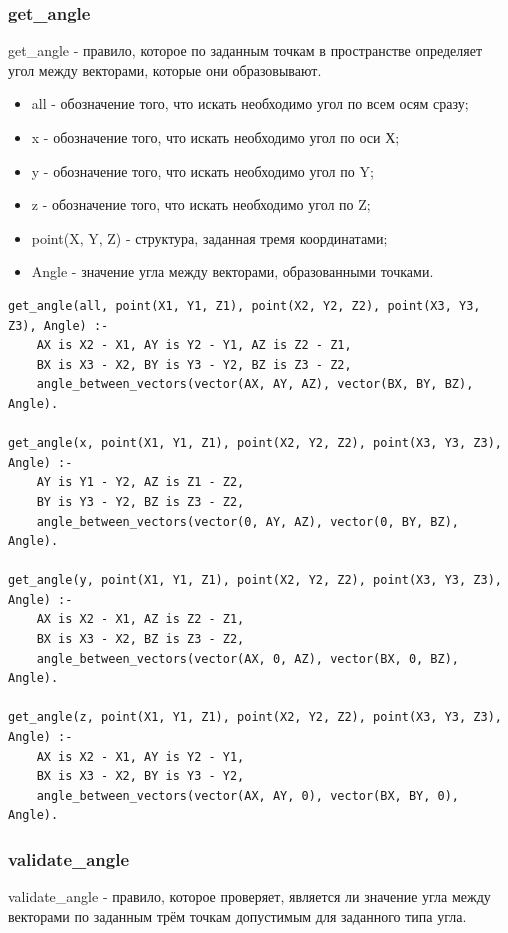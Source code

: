 \subsubsection{get\_angle}
\hspace{0.6cm} get\_angle - правило, которое по заданным точкам в пространстве определяет угол между векторами, которые они образовывают.

\begin{itemize}
	\item all - обозначение того, что искать необходимо угол по всем осям сразу;
	\item x - обозначение того, что искать необходимо угол по оси Х;
	\item y - обозначение того, что искать необходимо угол по Y;
	\item z - обозначение того, что искать необходимо угол по Z;
	\item point(X, Y, Z) - структура, заданная тремя координатами;
	\item Angle - значение угла между векторами, образованными точками.
\end{itemize}

\begin{lstlisting}[caption=Реализация правила get\_angle, label=rules:getangle]
get_angle(all, point(X1, Y1, Z1), point(X2, Y2, Z2), point(X3, Y3, Z3), Angle) :-
	AX is X2 - X1, AY is Y2 - Y1, AZ is Z2 - Z1,
	BX is X3 - X2, BY is Y3 - Y2, BZ is Z3 - Z2,
	angle_between_vectors(vector(AX, AY, AZ), vector(BX, BY, BZ), Angle).
	
get_angle(x, point(X1, Y1, Z1), point(X2, Y2, Z2), point(X3, Y3, Z3), Angle) :-
	AY is Y1 - Y2, AZ is Z1 - Z2,
	BY is Y3 - Y2, BZ is Z3 - Z2,
	angle_between_vectors(vector(0, AY, AZ), vector(0, BY, BZ), Angle).
	
get_angle(y, point(X1, Y1, Z1), point(X2, Y2, Z2), point(X3, Y3, Z3), Angle) :-
	AX is X2 - X1, AZ is Z2 - Z1,
	BX is X3 - X2, BZ is Z3 - Z2,
	angle_between_vectors(vector(AX, 0, AZ), vector(BX, 0, BZ), Angle).
	
get_angle(z, point(X1, Y1, Z1), point(X2, Y2, Z2), point(X3, Y3, Z3), Angle) :-
	AX is X2 - X1, AY is Y2 - Y1,
	BX is X3 - X2, BY is Y3 - Y2,
	angle_between_vectors(vector(AX, AY, 0), vector(BX, BY, 0), Angle).
\end{lstlisting}


\subsubsection{validate\_angle}
\hspace{0.6cm} validate\_angle - правило, которое проверяет, является ли значение угла между векторами по заданным трём точкам допустимым для заданного типа угла.

